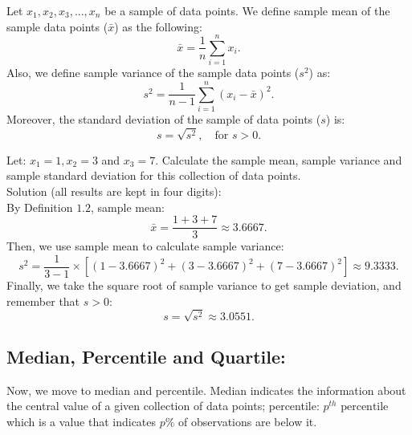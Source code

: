 
\begin{definition}
	Let $x_1, x_2, x_3, ..., x_n$ be a sample of data points. We define sample mean of the sample data points ($\bar{x}$) as the following: 
	$$ \bar{x} = \frac{1}{n} \sum_{i=1}^{n} x_i. $$
	Also, we define sample variance of the sample data points ($s^2$) as: \[ s^2 = \frac{1}{n-1} \sum_{i=1}^{n}(x_i - \bar{x})^2.\] Moreover, the standard deviation of the sample of data points ($s$) is: \[ s = \sqrt{s^2}, \quad \text{for } s > 0.\]
\end{definition}
	
\begin{example}
Let: $x_1 = 1, x_2 = 3$ and $x_3 = 7$. Calculate the sample mean, sample variance and sample standard deviation for this collection of data points.\\


Solution (all results are kept in four digits):\\
By Definition $1.2$, sample mean: \[ \bar{x} = \frac{1+3+7}{3} \approx 3.6667.\]
Then, we use sample mean to calculate sample variance: \[ s^2 = \frac{1}{3-1} \times [(1-3.6667)^2+(3-3.6667)^2+(7-3.6667)^2] \approx 9.3333.\]
Finally, we take the square root of sample variance to get sample deviation, and remember that $s > 0$: \[ s = \sqrt{s^2} \approx 3.0551.\]

\end{example}

\subsection{Median, Percentile and Quartile:}
	
Now, we move to median and percentile. Median indicates the information about the central value of a given collection of data points; percentile: $p^{th} \text{ percentile}$ which is a value that indicates $p \%$ of observations are below it.\\

